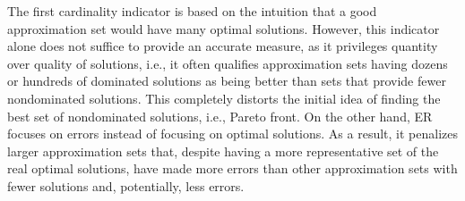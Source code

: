 	The first cardinality indicator is based on the intuition that a good approximation set would have many optimal solutions. However, this indicator alone does not suffice to provide an accurate measure, as it privileges quantity over quality of solutions, i.e., it often qualifies approximation sets having dozens or hundreds of dominated solutions as being better than sets that provide fewer nondominated solutions. This completely distorts the initial idea of finding the best set of nondominated solutions, i.e., Pareto front. On the other hand, \ac{ER} focuses on errors instead of focusing on optimal solutions. As a result, it penalizes larger approximation sets that, despite having a more representative set of the real optimal solutions, have made more errors than other approximation sets with fewer solutions and, potentially, less errors. 
	

